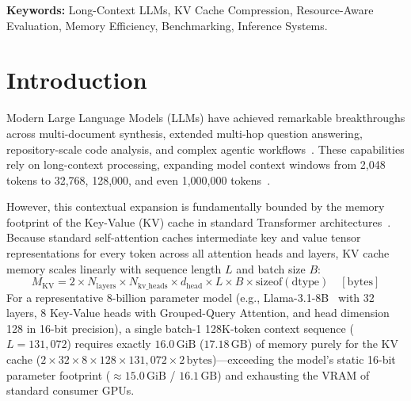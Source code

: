 \documentclass[11pt,a4paper]{article}
\begin{document}
\noindent\textbf{Keywords:} Long-Context LLMs, KV Cache Compression, Resource-Aware Evaluation, Memory Efficiency, Benchmarking, Inference Systems.

\vspace{1.0em}
\noindent{}
\vspace{1.0em}

\section{Introduction}
\label{sec:introduction}

Modern Large Language Models (LLMs) have achieved remarkable breakthroughs across multi-document synthesis, extended multi-hop question answering, repository-scale code analysis, and complex agentic workflows~\cite{brown2020language,achiam2023gpt4,touvron2023llama,bai2023qwen}. These capabilities rely on long-context processing, expanding model context windows from 2,048 tokens to 32,768, 128,000, and even 1,000,000 tokens~\cite{reid2024gemini,deepseek2024v2}.

However, this contextual expansion is fundamentally bounded by the memory footprint of the Key-Value (KV) cache in standard Transformer architectures~\cite{vaswani2017attention}. Because standard self-attention caches intermediate key and value tensor representations for every token across all attention heads and layers, KV cache memory scales linearly with sequence length $L$ and batch size $B$:
\begin{equation}
\label{eq:kv_size_intro}
\boxed{
M_{\text{KV}} = 2 \times N_{\text{layers}} \times N_{\text{kv\_heads}} \times d_{\text{head}} \times L \times B \times \text{sizeof}(\text{dtype}) \quad [\text{bytes}]
}
\end{equation}
For a representative 8-billion parameter model (e.g., Llama-3.1-8B~\cite{dubey2024llama3} with 32 layers, 8 Key-Value heads with Grouped-Query Attention, and head dimension 128 in 16-bit precision), a single batch-1 128K-token context sequence ($L = 131{,}072$) requires exactly $16.0\,\text{GiB}$ ($17.18\,\text{GB}$) of memory purely for the KV cache ($2 \times 32 \times 8 \times 128 \times 131{,}072 \times 2\,\text{bytes}$)---exceeding the model's static 16-bit parameter footprint ($\approx 15.0\,\text{GiB}$ / $16.1\,\text{GB}$) and exhausting the VRAM of standard consumer GPUs.
\end{document}
